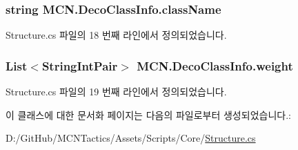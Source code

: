\subsubsection[{\texorpdfstring{class\+Name}{className}}]{\setlength{\rightskip}{0pt plus 5cm}string M\+C\+N.\+Deco\+Class\+Info.\+class\+Name}\hypertarget{class_m_c_n_1_1_deco_class_info_a3b0fc8a06269e57ded3835ea02026859}{}\label{class_m_c_n_1_1_deco_class_info_a3b0fc8a06269e57ded3835ea02026859}


Structure.\+cs 파일의 18 번째 라인에서 정의되었습니다.

\subsubsection[{\texorpdfstring{weight}{weight}}]{\setlength{\rightskip}{0pt plus 5cm}List$<${\bf String\+Int\+Pair}$>$ M\+C\+N.\+Deco\+Class\+Info.\+weight}\hypertarget{class_m_c_n_1_1_deco_class_info_a04ed1d8d36502303fa7a2a1f872f1681}{}\label{class_m_c_n_1_1_deco_class_info_a04ed1d8d36502303fa7a2a1f872f1681}


Structure.\+cs 파일의 19 번째 라인에서 정의되었습니다.



이 클래스에 대한 문서화 페이지는 다음의 파일로부터 생성되었습니다.\+:\begin{DoxyCompactItemize}
\item 
D\+:/\+Git\+Hub/\+M\+C\+N\+Tactics/\+Assets/\+Scripts/\+Core/\hyperlink{_structure_8cs}{Structure.\+cs}\end{DoxyCompactItemize}
